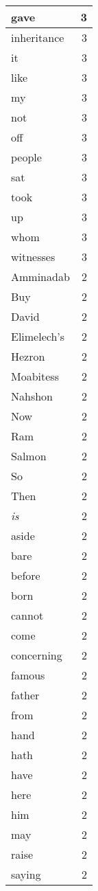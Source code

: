 \begin{center}
\begin{longtable}{l|r}
gave & 3 \\ \hline
inheritance & 3 \\ \hline
it & 3 \\ \hline
like & 3 \\ \hline
my & 3 \\ \hline
not & 3 \\ \hline
off & 3 \\ \hline
people & 3 \\ \hline
sat & 3 \\ \hline
took & 3 \\ \hline
up & 3 \\ \hline
whom & 3 \\ \hline
witnesses & 3 \\ \hline
Amminadab & 2 \\ \hline
Buy & 2 \\ \hline
David & 2 \\ \hline
Elimelech's & 2 \\ \hline
Hezron & 2 \\ \hline
Moabitess & 2 \\ \hline
Nahshon & 2 \\ \hline
Now & 2 \\ \hline
Ram & 2 \\ \hline
Salmon & 2 \\ \hline
So & 2 \\ \hline
Then & 2 \\ \hline
\emph{is} & 2 \\ \hline
aside & 2 \\ \hline
bare & 2 \\ \hline
before & 2 \\ \hline
born & 2 \\ \hline
cannot & 2 \\ \hline
come & 2 \\ \hline
concerning & 2 \\ \hline
famous & 2 \\ \hline
father & 2 \\ \hline
from & 2 \\ \hline
hand & 2 \\ \hline
hath & 2 \\ \hline
have & 2 \\ \hline
here & 2 \\ \hline
him & 2 \\ \hline
may & 2 \\ \hline
raise & 2 \\ \hline
saying & 2 \\ \hline

\end{longtable}
\end{center}
